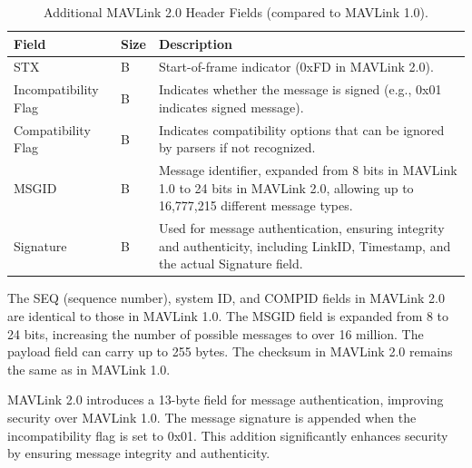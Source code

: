 \begin{table}[H]
\renewcommand{\arraystretch}{1.3} %
\centering
\caption{Additional MAVLink 2.0 Header Fields (compared to MAVLink 1.0).}
\begin{tabular}{|>{\centering\arraybackslash}m{2.5cm}|
                >{\centering\arraybackslash}m{2cm}|
                >{\arraybackslash}m{7cm}|}
\hline
\textbf{Field} & \textbf{Size} & \textbf{Description} \\
\hline
STX & 1 B & \vspace{0pt}Start-of-frame indicator (0xFD in MAVLink 2.0). \\
\hline
Incompatibility Flag & 1 B & \vspace{0pt}Indicates whether the message is signed (e.g., 0x01 indicates signed message). \\
\hline
Compatibility Flag & 1 B & \vspace{0pt}Indicates compatibility options that can be ignored by parsers if not recognized. \\
\hline
MSGID & 3 B & \vspace{0pt}Message identifier, expanded from 8 bits in MAVLink 1.0 to 24 bits in MAVLink 2.0, allowing up to 16,777,215 different message types. \\
\hline
Signature & 13 B & \vspace{0pt}Used for message authentication, ensuring integrity and authenticity, including LinkID, Timestamp, and the actual Signature field. \\
\hline
\end{tabular}
\label{tab:mavlink2_additional_fields}
\end{table}

The SEQ (sequence number), system ID, and COMPID fields in MAVLink 2.0 are identical to those in MAVLink 1.0. The MSGID field is expanded from 8 to 24 bits, increasing the number of possible messages to over 16 million. The payload field can carry up to 255 bytes. The checksum in MAVLink 2.0 remains the same as in MAVLink 1.0.

\vspace{0.5cm}

MAVLink 2.0 introduces a 13-byte field for message authentication, improving security over MAVLink 1.0. The message signature is appended when the incompatibility flag is set to 0x01. This addition significantly enhances security by ensuring message integrity and authenticity.

\vspace{0.5cm}

